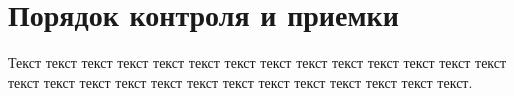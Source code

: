 \newpage\section{Порядок контроля и приемки}\label{section:Порядок контроля и приемки}

Текст текст текст текст текст текст текст текст текст текст текст текст текст текст текст текст текст текст текст текст текст текст текст текст текст текст текст.